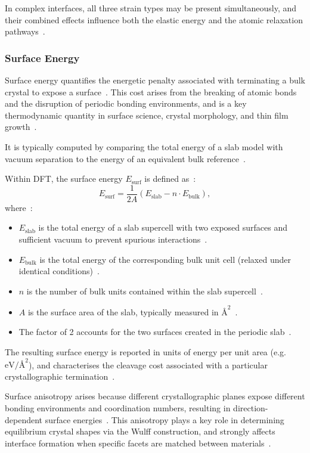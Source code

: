 In complex interfaces, all three strain types may be present simultaneously, and their combined effects influence both the elastic energy and the atomic relaxation pathways~\nocite{}.

\subsubsection*{Surface Energy}

Surface energy quantifies the energetic penalty associated with terminating a bulk crystal to expose a surface~\nocite{}.
This cost arises from the breaking of atomic bonds and the disruption of periodic bonding environments, and is a key thermodynamic quantity in surface science, crystal morphology, and thin film growth~\nocite{}.

It is typically computed by comparing the total energy of a slab model with vacuum separation to the energy of an equivalent bulk reference~\nocite{}.

Within DFT, the surface energy $E_\mathrm{surf}$ is defined as~\nocite{}:
\begin{equation}
    E_\mathrm{surf} = \frac{1}{2A} \left( E_\mathrm{slab} - n \cdot E_\mathrm{bulk} \right),
\end{equation}
where~\nocite{}:
\begin{itemize}
    \item $E_\mathrm{slab}$ is the total energy of a slab supercell with two exposed surfaces and sufficient vacuum to prevent spurious interactions~\nocite{}.
    \item $E_\mathrm{bulk}$ is the total energy of the corresponding bulk unit cell (relaxed under identical conditions)~\nocite{}.
    \item $n$ is the number of bulk units contained within the slab supercell~\nocite{}.
    \item $A$ is the surface area of the slab, typically measured in $\text{\AA{}}^2$~\nocite{}.
    \item The factor of 2 accounts for the two surfaces created in the periodic slab~\nocite{}.
\end{itemize}

The resulting surface energy is reported in units of energy per unit area (e.g. $\text{eV/\AA{}}^2$), and characterises the cleavage cost associated with a particular crystallographic termination~\nocite{}.

Surface anisotropy arises because different crystallographic planes expose different bonding environments and coordination numbers, resulting in direction-dependent surface energies~\nocite{}.
This anisotropy plays a key role in determining equilibrium crystal shapes via the Wulff construction, and strongly affects interface formation when specific facets are matched between materials~\nocite{}.

